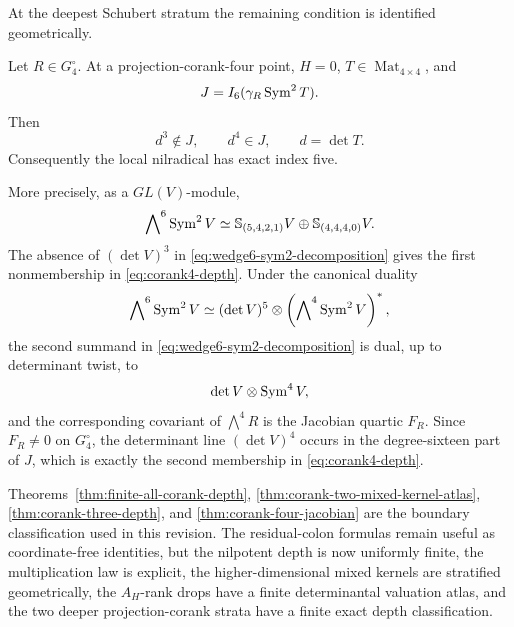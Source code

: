 At the deepest Schubert stratum the remaining condition is identified
geometrically.

\begin{theorem}
\label{thm:corank-four-jacobian}
Let \(R\in G_4^\circ\).  At a projection-corank-four point,
\(H=0\), \(T\in\operatorname{Mat}_{4\times4}\), and
\[
 J=I_6(\gamma_R\operatorname{Sym}^2T).
\]
Then
\begin{equation}\label{eq:corank4-depth}
 d^3\notin J,\qquad d^4\in J,\qquad d=\det T.
\end{equation}
Consequently the local nilradical has exact index five.

More precisely, as a \(GL(V)\)-module,
\begin{equation}\label{eq:wedge6-sym2-decomposition}
 \bigwedge\nolimits^6\operatorname{Sym}^2V
 \simeq
 \mathbb S_{(5,4,2,1)}V
 \oplus
 \mathbb S_{(4,4,4,0)}V.
\end{equation}
The absence of \((\det V)^3\) in
\eqref{eq:wedge6-sym2-decomposition} gives the first
nonmembership in \eqref{eq:corank4-depth}.  Under the canonical
duality
\[
 \bigwedge\nolimits^6\operatorname{Sym}^2V
 \simeq
 (\det V)^5\otimes
 \left(\bigwedge\nolimits^4\operatorname{Sym}^2V\right)^*,
\]
the second summand in \eqref{eq:wedge6-sym2-decomposition} is dual,
up to determinant twist, to
\[
 \det V\otimes\operatorname{Sym}^4V,
\]
and the corresponding covariant of \(\bigwedge^4R\) is the Jacobian
quartic \(F_R\).  Since \(F_R\ne0\) on \(G_4^\circ\), the determinant
line \((\det V)^4\) occurs in the degree-sixteen part of \(J\), which
is exactly the second membership in
\eqref{eq:corank4-depth}.
\end{theorem}

Theorems~\ref{thm:finite-all-corank-depth},
\ref{thm:corank-two-mixed-kernel-atlas},
\ref{thm:corank-three-depth}, and
\ref{thm:corank-four-jacobian} are the boundary classification used
in this revision.  The residual-colon formulas remain useful as
coordinate-free identities, but the nilpotent depth is now uniformly
finite, the multiplication law is explicit, the higher-dimensional
mixed kernels are stratified geometrically, the \(A_H\)-rank drops
have a finite determinantal valuation atlas, and the two deeper
projection-corank strata have a finite exact depth classification.
